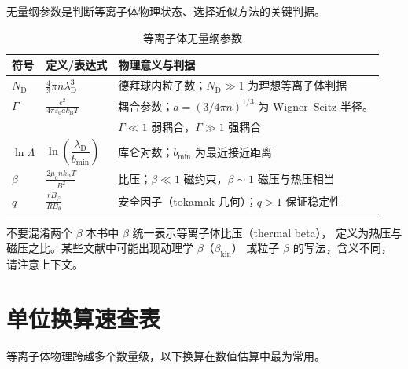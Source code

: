 \documentclass[12pt,a4paper,openany,oneside]{book}
\newcommand{\eps}{\varepsilon}
\begin{document}
无量纲参数是判断等离子体物理状态、选择近似方法的关键判据。

\begin{table}[htbp]
\centering
\caption{等离子体无量纲参数}
\begin{tabular}{@{}llp{6.5cm}@{}}
\toprule
\textbf{符号} & \textbf{定义/表达式} & \textbf{物理意义与判据} \\
\midrule
$N_\mathrm{D}$ & $\tfrac{4}{3}\pi n\lambda_\mathrm{D}^3$ & 德拜球内粒子数；$N_\mathrm{D}\gg 1$ 为理想等离子体判据 \\
$\Gamma$ & $\displaystyle\frac{e^2}{4\pi\eps_0 a k_\mathrm{B} T}$ & 耦合参数；$a=(3/4\pi n)^{1/3}$ 为 Wigner--Seitz 半径。\\ & & $\Gamma\ll 1$ 弱耦合，$\Gamma\gg 1$ 强耦合 \\
$\ln\Lambda$ & $\ln\left(\dfrac{\lambda_\mathrm{D}}{b_{\min}}\right)$ & 库仑对数；$b_{\min}$ 为最近接近距离 \\
$\beta$ & $\displaystyle\frac{2\mu_0 n k_\mathrm{B} T}{B^2}$ & 比压；$\beta\ll 1$ 磁约束，$\beta\sim 1$ 磁压与热压相当 \\
$q$ & $\displaystyle\frac{r B_\varphi}{R B_\theta}$ & 安全因子（tokamak 几何）；$q>1$ 保证稳定性 \\
\bottomrule
\end{tabular}
\end{table}

\begin{warning}{不要混淆两个 $\beta$}{}
本书中 $\beta$ 统一表示等离子体比压（thermal beta），
定义为热压与磁压之比。某些文献中可能出现动理学 $\beta$（$\beta_{\mathrm{kin}}$）
或粒子 $\beta$ 的写法，含义不同，请注意上下文。
\end{warning}


\section*{单位换算速查表}

等离子体物理跨越多个数量级，以下换算在数值估算中最为常用。
\end{document}
